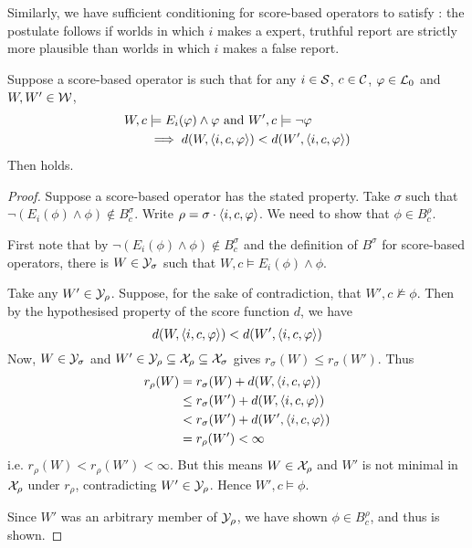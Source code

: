 Similarly, we have sufficient conditioning for score-based operators to satisfy
\strongcondsucc{}: the postulate follows if worlds in which $i$ makes a expert,
truthful report are strictly more plausible than worlds in which $i$ makes a
false report.

\begin{lemma}
    \label{lemma:score_based_strongcondsucc_sufficient_conditions}
    Suppose a score-based operator is such that for any $i \in \S$, $c \in \C$,
    $\phi \in \lprop$ and $W, W' \in \W$,
    \begin{align*}
        W, c &\models E_i(\phi) \land \phi
        \text{ and }
        W', c \models \neg\phi \\
        &\implies
        d(W, \tuple{i, c, \phi}) < d(W', \tuple{i, c, \phi})
    \end{align*}
    Then \strongcondsucc{} holds.
\end{lemma}

\begin{proof}
    Suppose a score-based operator has the stated property. Take $\sigma$ such
    that $\neg(E_i(\phi) \land \phi) \notin B^\sigma_c$. Write $\rho = \sigma
    \concat \tuple{i, c, \phi}$. We need to show that $\phi \in B^\rho_c$.

    First note that by $\neg(E_i(\phi) \land \phi) \notin B^\sigma_c$ and the
    definition of $B^\sigma$ for score-based operators, there is $W \in
    \Y_\sigma$ such that $W, c \models E_i(\phi) \land \phi$.

    Take any $W' \in \Y_\rho$. Suppose, for the sake of contradiction, that
    $W', c \not\models \phi$. Then by the hypothesised property of the score
    function $d$, we have
    \[
        d(W, \tuple{i, c, \phi}) < d(W', \tuple{i, c, \phi})
    \]
    Now, $W \in \Y_\sigma$ and $W' \in \Y_\rho \subseteq \X_\rho \subseteq
    \X_\sigma$ gives $r_\sigma(W) \le r_\sigma(W')$. Thus
    \begin{align*}
        r_\rho(W)
        &= r_\sigma(W) + d(W, \tuple{i, c, \phi}) \\
        &\le r_\sigma(W') + d(W, \tuple{i, c, \phi}) \\
        &< r_\sigma(W') + d(W', \tuple{i, c, \phi}) \\
        &= r_\rho(W') < \infty
    \end{align*}
    i.e. $r_\rho(W) < r_\rho(W') < \infty$. But this means $W \in \X_\rho$ and
    $W'$ is not minimal in $\X_\rho$ under $r_\rho$, contradicting $W' \in
    \Y_\rho$. Hence $W', c \models \phi$.

    Since $W'$ was an arbitrary member of $\Y_\rho$, we have shown $\phi \in
    B^\rho_c$, and thus \strongcondsucc{} is shown.
\end{proof}


